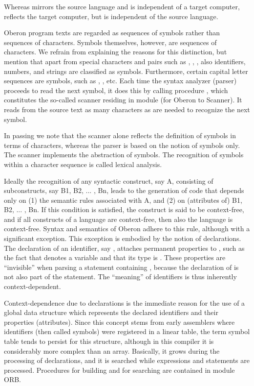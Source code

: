 Whereas  mirrors the source language and is independent of a target computer,  reflects the target computer, but is independent of the source language.

Oberon program texts are regarded as sequences of symbols rather than sequences of characters. Symbols themselves, however, are sequences of characters. We refrain from explaining the reasons for this distinction, but mention that apart from special characters and pairs such as \code{+}, \code{\&}, \code{<=}, also identifiers, numbers, and strings are classified as symbols. Furthermore, certain capital letter sequences are symbols, such as , , etc. Each time the syntax analyzer (parser) proceeds to read the next symbol, it does this by calling procedure , which constitutes the so-called scanner residing in module  (for Oberon to  Scanner). It reads from the source text as many characters as are needed to recognize the next symbol.

In passing we note that the scanner alone reflects the definition of symbols in terms of characters, whereas the parser is based on the notion of symbols only. The scanner implements the abstraction of symbols. The recognition of symbols within a character sequence is called lexical analysis.

Ideally the recognition of any syntactic construct, say A, consisting of subconstructs, say B1, B2, ... , Bn, leads to the generation of code that depends only on (1) the semantic rules associated with A, and (2) on (attributes of) B1, B2, ... , Bn. If this condition is satisfied, the construct is said to be context-free, and if all constructs of a language are context-free, then also the language is context-free. Syntax and semantics of Oberon adhere to this rule, although with a significant exception. This exception is embodied by the notion of declarations. The declaration of an identifier, say , attaches permanent properties to , such as the fact that  denotes a variable and that its type is . These properties are ``invisible'' when parsing a statement containing , because the declaration of  is not also part of the statement. The ``meaning'' of identifiers is thus inherently context-dependent.

Context-dependence due to declarations is the immediate reason for the use of a global data structure which represents the declared identifiers and their properties (attributes). Since this concept stems from early assemblers where identifiers (then called symbols) were registered in a linear table, the term symbol table tends to persist for this structure, although in this compiler it is considerably more complex than an array. Basically, it grows during the processing of declarations, and it is searched while expressions and statements are processed. Procedures for building and for searching are contained in module ORB.

